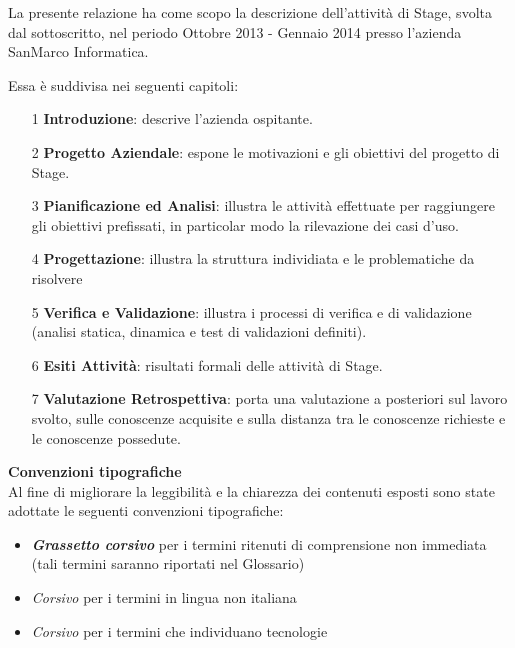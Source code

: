\documentclass[10pt, a4paper, oneside]{Thesis} %
\begin{document}
La presente relazione ha come scopo la descrizione dell'attività di Stage, svolta dal sottoscritto, nel periodo Ottobre 2013 - Gennaio 2014 presso l'azienda SanMarco Informatica. 

Essa è suddivisa nei seguenti capitoli:

\begin{itemize}
\item[1] \textbf{Introduzione}: descrive l'azienda ospitante.
\item[2] \textbf{Progetto Aziendale}: espone le motivazioni e gli obiettivi del progetto di Stage.
\item[3] \textbf{Pianificazione ed Analisi}: illustra le attività effettuate per raggiungere gli obiettivi prefissati, in particolar modo la rilevazione dei casi d'uso.
\item[4] \textbf{Progettazione}: illustra la struttura individiata e le problematiche da risolvere
\item[5] \textbf{Verifica e Validazione}: illustra i processi di verifica e di validazione (analisi statica, dinamica e test di validazioni definiti).
\item[6] \textbf{Esiti Attività}: risultati formali delle attività di Stage.
\item[7] \textbf{Valutazione Retrospettiva}: porta una valutazione a posteriori sul lavoro svolto, sulle conoscenze acquisite e sulla distanza tra le conoscenze richieste e le conoscenze possedute.

\end{itemize}


\clearpage
\textbf{Convenzioni tipografiche}\\


Al fine di migliorare la leggibilità e la chiarezza dei contenuti esposti sono state adottate le seguenti
convenzioni tipografiche:

\begin{itemize}
  \item \textbf{\textit{Grassetto corsivo}} per i termini ritenuti di comprensione non immediata (tali termini saranno riportati nel Glossario)
  \item \textit{Corsivo} per i termini in lingua non italiana
  \item \textit{Corsivo} per i termini che individuano tecnologie
\end{itemize}

\clearpage %

\end{document}
